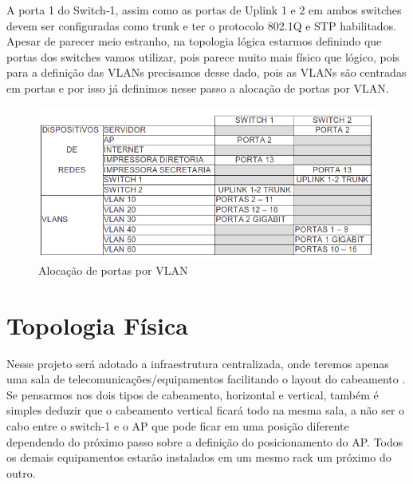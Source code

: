 \documentclass[	DIV=calc,%
							paper=a4,%
							fontsize=12pt,%
							onecolumn]{scrartcl}	 					%
\begin{document}
A porta 1 do Switch-1, assim como as portas de Uplink 1 e 2 em ambos switches devem ser configuradas como trunk e ter o protocolo 802.1Q e STP habilitados. Apesar de parecer meio estranho, na topologia lógica estarmos definindo que portas dos switches vamos utilizar, pois parece muito mais físico que lógico, pois para a definição das VLANs precisamos desse dado, pois as VLANs são centradas em portas e por isso já definimos nesse passo a alocação de portas por VLAN.

 \begin{figure}[H]
	\centering
	\includegraphics[width=\textwidth]{fig3}
	\caption{Alocação de portas por VLAN}
	\label{fig3}
\end{figure}


\section{Topologia Física}
Nesse projeto será adotado a infraestrutura  centralizada, onde teremos apenas uma sala de telecomunicações/equipamentos facilitando o layout do cabeamento . Se pensarmos nos dois tipos de cabeamento, horizontal e vertical, também é simples deduzir que o cabeamento vertical ficará todo na mesma sala, a não ser o cabo entre o switch-1 e o AP que pode ficar em uma posição diferente dependendo do próximo passo sobre a definição do posicionamento do AP. Todos os demais equipamentos estarão instalados em um mesmo rack  um próximo do outro. 
\end{document}
